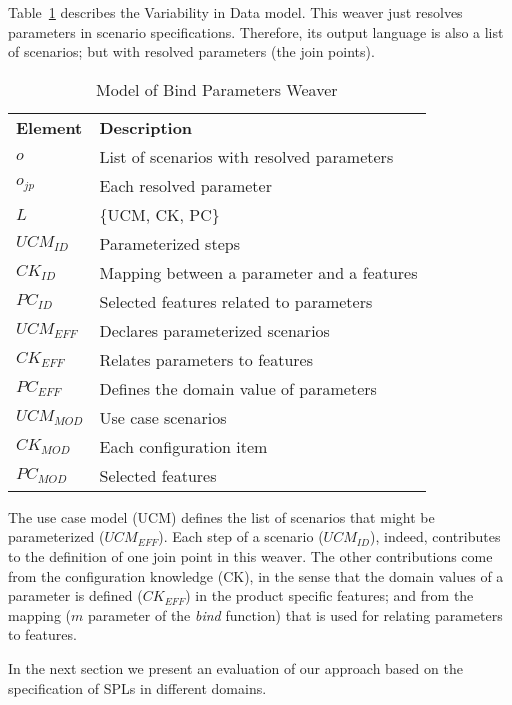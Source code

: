 Table~\ref{tab:bp-weaver} describes the Variability in Data model. This weaver
just resolves parameters in scenario specifications. Therefore, its output
language is also a list of scenarios; but with resolved parameters (the join
points).


\begin{table}[th]
\begin{center}
\caption{Model of Bind Parameters Weaver} \label{tab:bp-weaver}
\begin{tabular}{p{0.7in}p{2.3in}}
   \hline\noalign{\smallskip}
  {\bf Element} & {\bf Description} \\
   \noalign{\smallskip}
   \hline
   \noalign{\smallskip}
   $o$              	& List of scenarios with resolved parameters  \\
   $o_{jp}$      	  	& Each resolved parameter \\
   $L$               	& \{UCM, CK, PC\} \\
   $UCM_{ID}$ 			& Parameterized steps \\
   $CK_{ID}$ 			& Mapping between a parameter and a features \\
   $PC_{ID}$    		& Selected features related to parameters \\
   $UCM_{EFF}$ 			& Declares parameterized scenarios \\
   $CK_{EFF}$ 			& Relates parameters to features \\
   $PC_{EFF}$    		& Defines the domain value of parameters \\
   $UCM_{MOD}$ 			& Use case scenarios \\
   $CK_{MOD}$ 			& Each configuration item \\
   $PC_{MOD}$    		& Selected features \\   
  \hline
  \end{tabular}
\end{center}
\end{table}

The use case model (UCM) defines the list of scenarios that might be
parameterized ($UCM_{EFF}$). Each step of a scenario ($UCM_{ID}$), indeed,
contributes to the definition of one join point in this weaver. The other
contributions come from the configuration knowledge (CK), in the sense that the
domain values of a parameter is defined ($CK_{EFF}$) in the product specific
features; and from the mapping ($m$ parameter of the \emph{bind} function) that
is used for relating parameters to features. 

In the next section we present an evaluation of our approach based on the
specification of SPLs in different domains.

